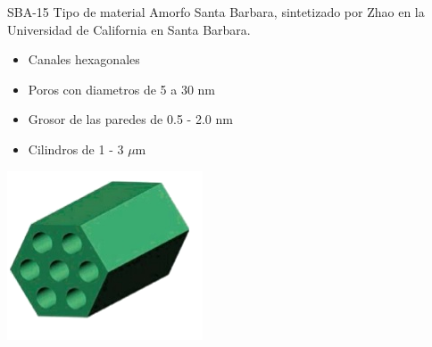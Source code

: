 \documentclass[handout]{beamer}
\begin{document}
\begin{frame}{SBA-15}
	Tipo de material Amorfo Santa Barbara, sintetizado por Zhao en la Universidad de California en Santa Barbara.
	\begin{itemize}
		\item Canales hexagonales
		\item Poros con diametros de 5 a 30 nm
		\item Grosor de las paredes de 0.5 - 2.0 nm
		\item Cilindros de 1 - 3 $\mu$m
	\end{itemize}
	\centering
	\includegraphics[width=0.3\linewidth]{sba-15.png}
\end{frame}
\end{document}
